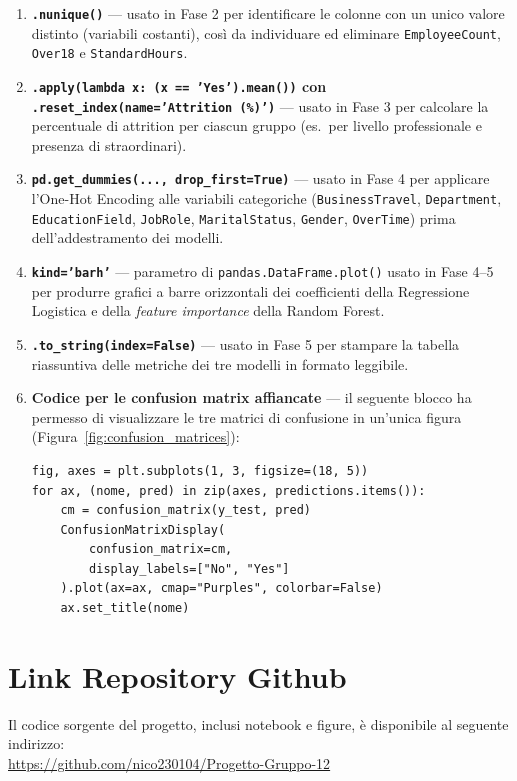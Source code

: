 \documentclass{article}
\begin{document}
\begin{enumerate}
 
  \item \textbf{\texttt{.nunique()}} --- usato in Fase 2 per identificare le colonne
    con un unico valore distinto (variabili costanti), così da individuare ed eliminare
    \texttt{EmployeeCount}, \texttt{Over18} e \texttt{StandardHours}.
 
  \item \textbf{\texttt{.apply(lambda x: (x == 'Yes').mean())} con
    \texttt{.reset\_index(name='Attrition (\%)')}} --- usato in Fase 3 per calcolare
    la percentuale di attrition per ciascun gruppo (es.\ per livello professionale
    e presenza di straordinari).
 
  \item \textbf{\texttt{pd.get\_dummies(..., drop\_first=True)}} --- usato in Fase 4
    per applicare l'One-Hot Encoding alle variabili categoriche
    (\texttt{BusinessTravel}, \texttt{Department}, \texttt{EducationField},
    \texttt{JobRole}, \texttt{MaritalStatus}, \texttt{Gender}, \texttt{OverTime})
    prima dell'addestramento dei modelli.
 
  \item \textbf{\texttt{kind='barh'}} --- parametro di \texttt{pandas.DataFrame.plot()} usato in Fase 4--5 per produrre grafici a barre orizzontali dei coefficienti della Regressione Logistica e della \emph{feature importance} della Random Forest.
 
  \item \textbf{\texttt{.to\_string(index=False)}} --- usato in Fase 5 per stampare
    la tabella riassuntiva delle metriche dei tre modelli in formato leggibile.
 
  \item \textbf{Codice per le confusion matrix affiancate} --- il seguente blocco
    ha permesso di visualizzare le tre matrici di confusione in un'unica figura
    (Figura~\ref{fig:confusion_matrices}):
\begin{verbatim}
fig, axes = plt.subplots(1, 3, figsize=(18, 5))
for ax, (nome, pred) in zip(axes, predictions.items()):
    cm = confusion_matrix(y_test, pred)
    ConfusionMatrixDisplay(
        confusion_matrix=cm,
        display_labels=["No", "Yes"]
    ).plot(ax=ax, cmap="Purples", colorbar=False)
    ax.set_title(nome)
\end{verbatim}
 
\end{enumerate}

\section*{Link Repository Github}
Il codice sorgente del progetto, inclusi notebook e figure, è disponibile al seguente indirizzo:\\\url{https://github.com/nico230104/Progetto-Gruppo-12}

\nocite{*}



 
\end{document}
